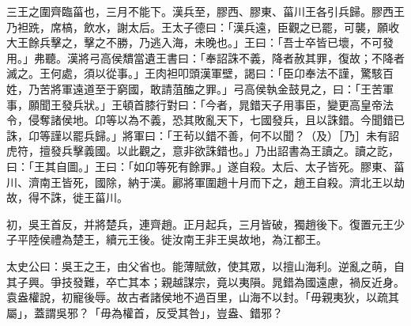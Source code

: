 \begin{pinyinscope}
三王之圍齊臨菑也，三月不能下。漢兵至，膠西、膠東、菑川王各引兵歸。膠西王乃袒跣，席槁，飲水，謝太后。王太子德曰：「漢兵遠，臣觀之已罷，可襲，願收大王餘兵擊之，擊之不勝，乃逃入海，未晚也。」王曰：「吾士卒皆已壞，不可發用。」弗聽。漢將弓高侯穨當遺王書曰：「奉詔誅不義，降者赦其罪，復故；不降者滅之。王何處，須以從事。」王肉袒叩頭漢軍壁，謁曰：「臣卬奉法不謹，驚駭百姓，乃苦將軍遠道至于窮國，敢請菹醢之罪。」弓高侯執金鼓見之，曰：「王苦軍事，願聞王發兵狀。」王頓首膝行對曰：「今者，晁錯天子用事臣，變更高皇帝法令，侵奪諸侯地。卬等以為不義，恐其敗亂天下，七國發兵，且以誅錯。今聞錯已誅，卬等謹以罷兵歸。」將軍曰：「王茍以錯不善，何不以聞？（及）［乃］未有詔虎符，擅發兵擊義國。以此觀之，意非欲誅錯也。」乃出詔書為王讀之。讀之訖，曰：「王其自圖。」王曰：「如卬等死有餘罪。」遂自殺。太后、太子皆死。膠東、菑川、濟南王皆死，國除，納于漢。酈將軍圍趙十月而下之，趙王自殺。濟北王以劫故，得不誅，徙王菑川。

初，吳王首反，并將楚兵，連齊趙。正月起兵，三月皆破，獨趙後下。復置元王少子平陸侯禮為楚王，續元王後。徙汝南王非王吳故地，為江都王。

太史公曰：吳王之王，由父省也。能薄賦斂，使其眾，以擅山海利。逆亂之萌，自其子興。爭技發難，卒亡其本；親越謀宗，竟以夷隕。晁錯為國遠慮，禍反近身。袁盎權說，初寵後辱。故古者諸侯地不過百里，山海不以封。「毋親夷狄，以疏其屬」，蓋謂吳邪？「毋為權首，反受其咎」，豈盎、錯邪？


\end{pinyinscope}
